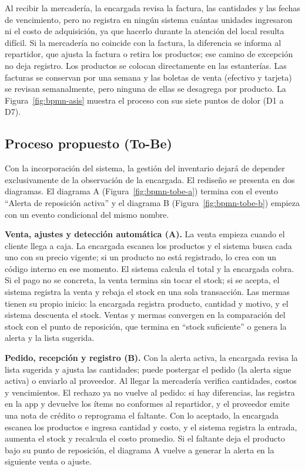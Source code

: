 \documentclass[10pt,a4paper]{article}
\begin{document}
Al recibir la mercadería, la encargada revisa la factura, las cantidades y las fechas de vencimiento, pero no registra en ningún sistema cuántas unidades ingresaron ni el costo de adquisición, ya que hacerlo durante la atención del local resulta difícil. Si la mercadería no coincide con la factura, la diferencia se informa al repartidor, que ajusta la factura o retira los productos; ese camino de excepción no deja registro. Los productos se colocan directamente en las estanterías. Las facturas se conservan por una semana y las boletas de venta (efectivo y tarjeta) se revisan semanalmente, pero ninguna de ellas se desagrega por producto. La Figura~\ref{fig:bpmn-asis} muestra el proceso con sus siete puntos de dolor (D1 a D7).


\subsection{Proceso propuesto (To-Be)}

Con la incorporación del sistema, la gestión del inventario dejará de depender exclusivamente de la observación de la encargada. El rediseño se presenta en dos diagramas. El diagrama A (Figura~\ref{fig:bpmn-tobe-a}) termina con el evento ``Alerta de reposición activa'' y el diagrama B (Figura~\ref{fig:bpmn-tobe-b}) empieza con un evento condicional del mismo nombre.

\textbf{Venta, ajustes y detección automática (A).} La venta empieza cuando el cliente llega a caja. La encargada escanea los productos y el sistema busca cada uno con su precio vigente; si un producto no está registrado, lo crea con un código interno en ese momento. El sistema calcula el total y la encargada cobra. Si el pago no se concreta, la venta termina sin tocar el stock; si se acepta, el sistema registra la venta y rebaja el stock en una sola transacción. Las mermas tienen su propio inicio: la encargada registra producto, cantidad y motivo, y el sistema descuenta el stock. Ventas y mermas convergen en la comparación del stock con el punto de reposición, que termina en ``stock suficiente'' o genera la alerta y la lista sugerida.

\textbf{Pedido, recepción y registro (B).} Con la alerta activa, la encargada revisa la lista sugerida y ajusta las cantidades; puede postergar el pedido (la alerta sigue activa) o enviarlo al proveedor. Al llegar la mercadería verifica cantidades, costos y vencimientos. El rechazo ya no vuelve al pedido: si hay diferencias, las registra en la app y devuelve los ítems no conformes al repartidor, y el proveedor emite una nota de crédito o reprograma el faltante. Con lo aceptado, la encargada escanea los productos e ingresa cantidad y costo, y el sistema registra la entrada, aumenta el stock y recalcula el costo promedio. Si el faltante deja el producto bajo su punto de reposición, el diagrama A vuelve a generar la alerta en la siguiente venta o ajuste.
\end{document}
